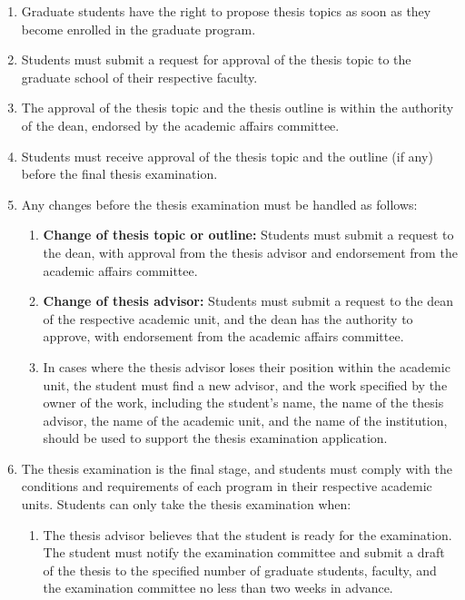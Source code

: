 \begin{enumerate}
    \item Graduate students have the right to propose thesis topics as soon as they become enrolled in the graduate program.
    
    \item Students must submit a request for approval of the thesis topic to the graduate school of their respective faculty.
    
    \item The approval of the thesis topic and the thesis outline is within the authority of the dean, endorsed by the academic affairs committee.
    
    \item Students must receive approval of the thesis topic and the outline (if any) before the final thesis examination.
    
    \item Any changes before the thesis examination must be handled as follows:
    \begin{enumerate}
        \item \textbf{Change of thesis topic or outline:} Students must submit a request to the dean, with approval from the thesis advisor and endorsement from the academic affairs committee.
        
        \item \textbf{Change of thesis advisor:} Students must submit a request to the dean of the respective academic unit, and the dean has the authority to approve, with endorsement from the academic affairs committee.
        
        \item In cases where the thesis advisor loses their position within the academic unit, the student must find a new advisor, and the work specified by the owner of the work, including the student's name, the name of the thesis advisor, the name of the academic unit, and the name of the institution, should be used to support the thesis examination application.
    \end{enumerate}
    
    \item The thesis examination is the final stage, and students must comply with the conditions and requirements of each program in their respective academic units. Students can only take the thesis examination when:
    \begin{enumerate}
        \item The thesis advisor believes that the student is ready for the examination. The student must notify the examination committee and submit a draft of the thesis to the specified number of graduate students, faculty, and the examination committee no less than two weeks in advance.
        

\end{enumerate}
\end{enumerate}
